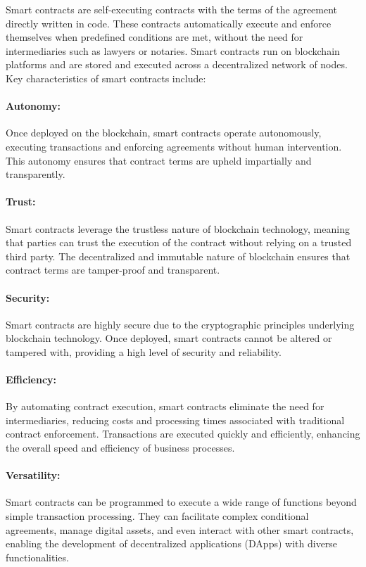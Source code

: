 Smart contracts are self-executing contracts with the terms of the agreement
directly written in code. These contracts automatically execute and enforce
themselves when predefined conditions are met, without the need for
intermediaries such as lawyers or notaries. Smart contracts run on blockchain
platforms and are stored and executed across a decentralized network of nodes.
Key characteristics of smart contracts include:

\paragraph{Autonomy:}
Once deployed on the blockchain, smart contracts operate autonomously,
executing transactions and enforcing agreements without human intervention.
This autonomy ensures that contract terms are upheld impartially and
transparently.

\paragraph{Trust:}
Smart contracts leverage the trustless nature of blockchain technology, meaning
that parties can trust the execution of the contract without relying on a
trusted third party. The decentralized and immutable nature of blockchain
ensures that contract terms are tamper-proof and transparent.

\paragraph{Security:}
Smart contracts are highly secure due to the cryptographic principles
underlying blockchain technology. Once deployed, smart contracts cannot be
altered or tampered with, providing a high level of security and reliability.

\paragraph{Efficiency:}
By automating contract execution, smart contracts eliminate the need for
intermediaries, reducing costs and processing times associated with traditional
contract enforcement. Transactions are executed quickly and efficiently,
enhancing the overall speed and efficiency of business processes.

\paragraph{Versatility:}
Smart contracts can be programmed to execute a wide range of functions beyond
simple transaction processing. They can facilitate complex conditional
agreements, manage digital assets, and even interact with other smart
contracts, enabling the development of decentralized applications (DApps) with
diverse functionalities.

